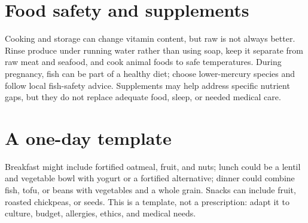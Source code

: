 \section{Food safety and supplements}
Cooking and storage can change vitamin content, but raw is not always better. Rinse produce under running water rather than using soap, keep it separate from raw meat and seafood, and cook animal foods to safe temperatures. During pregnancy, fish can be part of a healthy diet; choose lower-mercury species and follow local fish-safety advice. Supplements may help address specific nutrient gaps, but they do not replace adequate food, sleep, or needed medical care. \cite{fdaProduce,fdaSafeFood,fdaFishPregnancy}

\section{A one-day template}
Breakfast might include fortified oatmeal, fruit, and nuts; lunch could be a lentil and vegetable bowl with yogurt or a fortified alternative; dinner could combine fish, tofu, or beans with vegetables and a whole grain. Snacks can include fruit, roasted chickpeas, or seeds. This is a template, not a prescription: adapt it to culture, budget, allergies, ethics, and medical needs.
